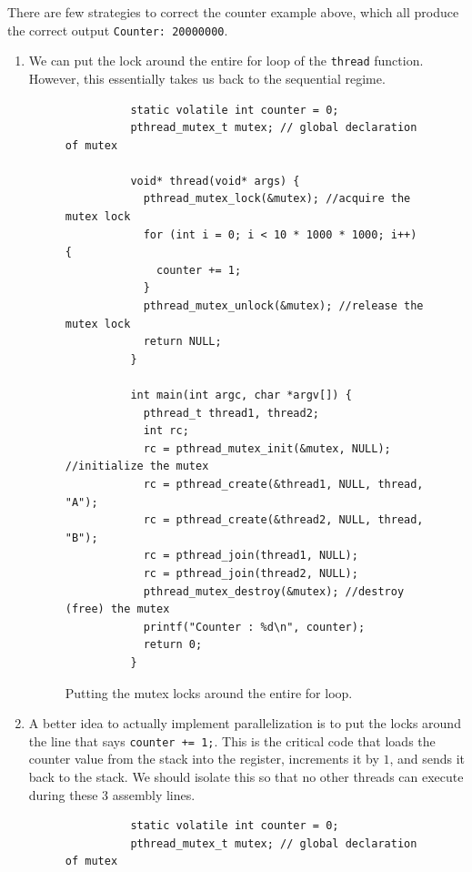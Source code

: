 \documentclass{article}
\newcounter{example}[section]
\newcounter{code}[section]
\begin{document}
    There are few strategies to correct the counter example above, which all produce the correct output \texttt{Counter: 20000000}. 
    \begin{enumerate}
      \item We can put the lock around the entire for loop of the \texttt{thread} function. However, this essentially takes us back to the sequential regime. 

      \begin{figure}[H]
        \centering 
        \begin{lstlisting}
          static volatile int counter = 0; 
          pthread_mutex_t mutex; // global declaration of mutex

          void* thread(void* args) {
            pthread_mutex_lock(&mutex); //acquire the mutex lock
            for (int i = 0; i < 10 * 1000 * 1000; i++) {
              counter += 1; 
            }
            pthread_mutex_unlock(&mutex); //release the mutex lock
            return NULL; 
          }

          int main(int argc, char *argv[]) {
            pthread_t thread1, thread2; 
            int rc; 
            rc = pthread_mutex_init(&mutex, NULL); //initialize the mutex
            rc = pthread_create(&thread1, NULL, thread, "A"); 
            rc = pthread_create(&thread2, NULL, thread, "B"); 
            rc = pthread_join(thread1, NULL); 
            rc = pthread_join(thread2, NULL); 
            pthread_mutex_destroy(&mutex); //destroy (free) the mutex
            printf("Counter : %d\n", counter); 
            return 0; 
          }
        \end{lstlisting}
        \caption{Putting the mutex locks around the entire for loop. } 
        \label{fig:first_try}
      \end{figure}

      \item A better idea to actually implement parallelization is to put the locks around the line that says \texttt{counter += 1;}. This is the critical code that loads the counter value from the stack into the register, increments it by $1$, and sends it back to the stack. We should isolate this so that no other threads can execute during these 3 assembly lines. 

      \begin{figure}[H]
        \centering 
        \begin{lstlisting}
          static volatile int counter = 0; 
          pthread_mutex_t mutex; // global declaration of mutex


\end{lstlisting}
\end{figure}
\end{enumerate}
\end{document}

